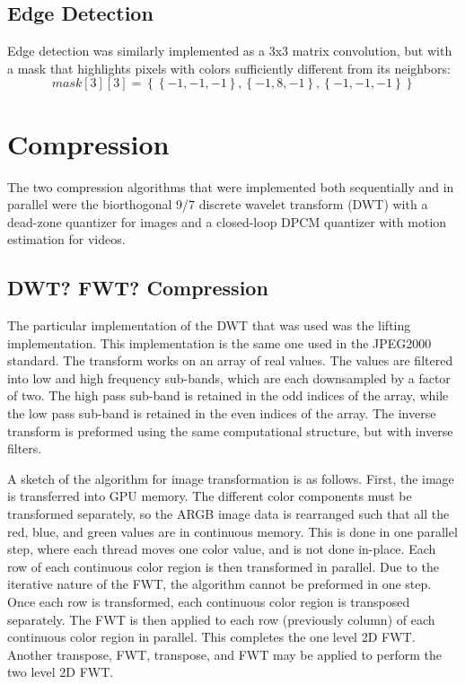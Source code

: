 \documentclass[10pt,twocolumn,twoside]{IEEEtran}
\begin{document}
\subsection{Edge Detection}
Edge detection was similarly implemented as a 3x3 matrix convolution, but with a mask that highlights pixels with colors sufficiently different from its neighbors:
\begin{equation*}
mask[3][3] = \left\{ \left\{-1, -1, -1\right\}, \left\{-1, 8, -1\right\}, \left\{-1, -1, -1\right\} \right\}
\end{equation*}

\section{Compression}
The two compression algorithms that were implemented both sequentially and in parallel were the biorthogonal 9/7 discrete wavelet transform (DWT) with a dead-zone quantizer for images and a closed-loop DPCM quantizer with motion estimation for videos.

\subsection{DWT? FWT? Compression}
	
The particular implementation of the DWT that was used was the lifting implementation. This implementation is the same one used in the JPEG2000 standard. The transform works on an array of real values. The values are filtered into low and high frequency sub-bands, which are each downsampled by a factor of two. The high pass sub-band is retained in the odd indices of the array, while the low pass sub-band is retained in the even indices of the array. The inverse transform is preformed using the same computational structure, but with inverse filters.

A sketch of the algorithm for image transformation is as follows. First, the image is transferred into GPU memory. The different color components must be transformed separately, so the ARGB image data is rearranged such that all the red, blue, and green values are in continuous memory. This is done in one parallel step, where each thread moves one color value, and is not done in-place. Each row of each continuous color region is then transformed in parallel. Due to the iterative nature of the FWT, the algorithm cannot be preformed in one step. Once each row is transformed, each continuous color region is transposed separately. The FWT is then applied to each row (previously column) of each continuous color region in parallel. This completes the one level 2D FWT. Another transpose, FWT, transpose, and FWT may be applied to perform the two level 2D FWT.
\end{document}
